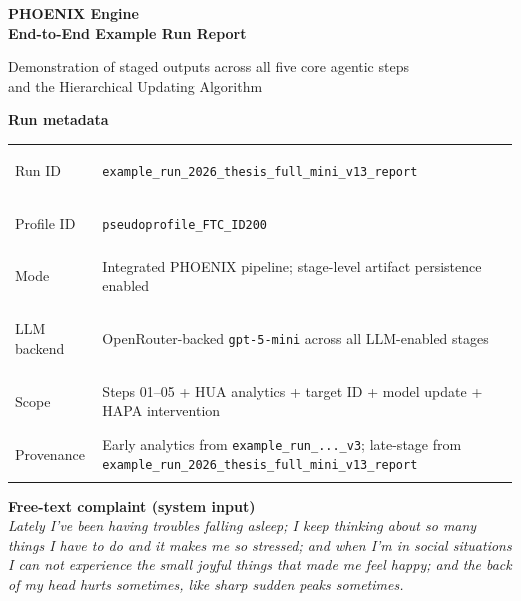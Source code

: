\documentclass[11pt,a4paper]{article}
\newcommand{\RunID}{example\_run\_2026\_thesis\_full\_mini\_v13\_report}
\newcommand{\ProfileID}{pseudoprofile\_FTC\_ID200}
\newcommand{\ComplaintText}{Lately I've been having troubles falling asleep; I keep thinking about so many things I have to do and it makes me so stressed; and when I'm in social situations I can not experience the small joyful things that made me feel happy; and the back of my head hurts sometimes, like sharp sudden peaks sometimes.}
\begin{document}
\begin{titlepage}
\centering
\vspace*{1.4cm}

{\fontsize{26}{32}\selectfont\bfseries\color{PhoenixBlue}
PHOENIX Engine\\[0.25em]
\fontsize{18}{24}\selectfont End-to-End Example Run Report\par}

\vspace{0.6cm}
{\large\color{PhoenixSlate}
Demonstration of staged outputs across all five core agentic steps\\
and the Hierarchical Updating Algorithm\par}
\vspace{1.2cm}

\begin{tcolorbox}[
  colback=white,colframe=PhoenixBorder,
  width=0.92\textwidth,boxrule=0.7pt,arc=2mm,
  left=9pt,right=9pt,top=8pt,bottom=8pt
]
\begin{center}
\small\textbf{Run metadata}
\end{center}
\renewcommand{\arraystretch}{1.22}
\small
\begin{tabularx}{0.98\textwidth}{@{}>{\bfseries\raggedright}p{}X@{}}
Run ID       & \texttt{\RunID} \\
Profile ID   & \texttt{\ProfileID} \\
Mode         & Integrated PHOENIX pipeline; stage-level artifact persistence enabled \\
LLM backend  & OpenRouter-backed \texttt{gpt-5-mini} across all LLM-enabled stages \\
Scope        & Steps 01--05 + HUA analytics + target ID + model update + HAPA intervention \\
Provenance   & Early analytics from \texttt{example\_run\_...\_v3}; late-stage from \texttt{\RunID} \\
\end{tabularx}
\renewcommand{\arraystretch}{1.0}
\normalsize
\end{tcolorbox}

\vspace{0.7cm}

\begin{tcolorbox}[
  colback=PhoenixAccent,colframe=PhoenixBlue,
  width=0.88\textwidth,boxrule=0.8pt,arc=2mm,
  left=10pt,right=10pt,top=9pt,bottom=9pt
]
\begin{center}
\textbf{\color{PhoenixBlue}Free-text complaint (system input)}\\[0.5em]
{\small\itshape\ComplaintText}
\end{center}
\end{tcolorbox}


\end{titlepage}
\end{document}
